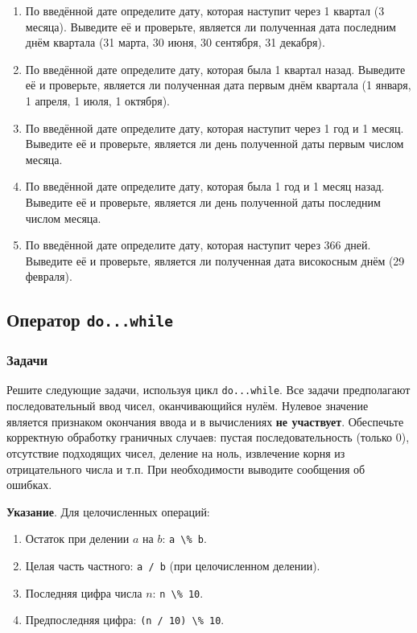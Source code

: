 \documentclass[12pt]{article}
\begin{document}
\begin{enumerate}
    \item По введённой дате определите дату, которая наступит через 1 квартал (3 месяца). Выведите её и проверьте, является ли полученная дата последним днём квартала (31 марта, 30 июня, 30 сентября, 31 декабря).
    \item По введённой дате определите дату, которая была 1 квартал назад. Выведите её и проверьте, является ли полученная дата первым днём квартала (1 января, 1 апреля, 1 июля, 1 октября).
    \item По введённой дате определите дату, которая наступит через 1 год и 1 месяц. Выведите её и проверьте, является ли день полученной даты первым числом месяца.
    \item По введённой дате определите дату, которая была 1 год и 1 месяц назад. Выведите её и проверьте, является ли день полученной даты последним числом месяца.
    \item По введённой дате определите дату, которая наступит через 366 дней. Выведите её и проверьте, является ли полученная дата високосным днём (29 февраля).
\end{enumerate}

\subsection{Оператор \texttt{do...while}}

\subsubsection*{Задачи}

Решите следующие задачи, используя цикл \texttt{do...while}. Все задачи предполагают последовательный ввод чисел, оканчивающийся нулём. Нулевое значение является признаком окончания ввода и в вычислениях \textbf{не участвует}. Обеспечьте корректную обработку граничных случаев: пустая последовательность (только 0), отсутствие подходящих чисел, деление на ноль, извлечение корня из отрицательного числа и т.п. При необходимости выводите сообщения об ошибках.

\textbf{Указание}. Для целочисленных операций:
\begin{enumerate}
\item Остаток при делении $a$ на $b$: \verb|a \% b|.
    \item Целая часть частного: \verb|a / b| (при целочисленном делении).
    \item Последняя цифра числа $n$: \verb|n \% 10|.
    \item Предпоследняя цифра: \verb|(n / 10) \% 10|.
\end{enumerate}
\end{document}
